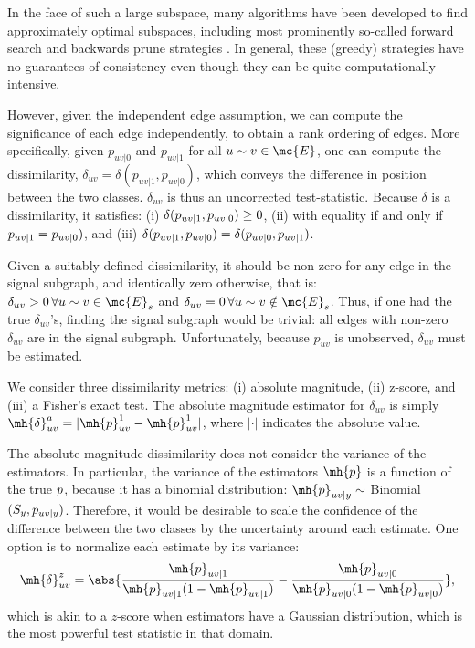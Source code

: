 In the face of such a large subspace, many algorithms have been developed to find approximately optimal subspaces, including most prominently so-called forward search and backwards prune strategies \cite{LiuYu05}.  In general, these (greedy) strategies have no guarantees of consistency even though they can be quite computationally intensive.  

However, given the independent edge assumption, we can compute the significance of each edge independently, to obtain a rank ordering of edges.  More specifically, given $p_{uv|0}$ and $p_{uv|1}$ for all $u \sim v \in \mc{E}$, one can compute the dissimilarity, $\delta_{uv}=\delta(p_{uv|1},p_{uv|0})$, which conveys the difference in position between the two classes.  $\delta_{uv}$ is thus an uncorrected test-statistic. Because $\delta$ is a dissimilarity, it satisfies: (i) $\delta(p_{uv|1},p_{uv|0}) \geq 0$, (ii) with equality if and only if $p_{uv|1}=p_{uv|0})$, and (iii) $\delta(p_{uv|1},p_{uv|0}) =\delta(p_{uv|0},p_{uv|1})$.   

Given a suitably defined dissimilarity, it should be non-zero for any edge in the signal subgraph, and identically zero otherwise, that is: $\delta_{uv} > 0 \, \forall u\sim v \in \mc{E}_s$ and $\delta_{uv}=0 \, \forall u\sim v \notin \mc{E}_s$.  Thus, if one had the true $\delta_{uv}$'s, finding the signal subgraph would be trivial: all edges with non-zero $\delta_{uv}$ are in the signal subgraph.  Unfortunately, because $p_{uv}$ is unobserved, $\delta_{uv}$ must be estimated.  

We consider three dissimilarity metrics: (i) absolute magnitude, (ii) z-score, and (iii) a Fisher's exact test.  The absolute magnitude estimator for $\delta_{uv}$ is simply $\mh{\delta}_{uv}^a=|\mh{p}_{uv}^1-\mh{p}_{uv}^1|$, where $|\cdot|$ indicates the absolute value. 

The absolute magnitude dissimilarity does not consider the variance of the estimators.  In particular, the variance of the estimators $\mh{p}$ is a function of the true $p$, because it has a binomial distribution: $\mh{p}_{uv|y} \sim$ Binomial$(S_y,p_{uv|y})$.  Therefore, it would be desirable to scale the confidence of the difference between the two classes by the uncertainty around each estimate.  One option is to normalize each estimate by its variance:
\begin{align} \label{eq:cor}
	\mh{\delta}_{uv}^z=  \abs{ \frac{\mh{p}_{uv|1}}{\mh{p}_{uv|1} (1-\mh{p}_{uv|1})} -  \frac{\mh{p}_{uv|0}}{\mh{p}_{uv|0} (1-\mh{p}_{uv|0})}},
\end{align}
which is akin to a $z$-score when estimators have a Gaussian distribution, which is the most powerful test statistic in that domain.
  
